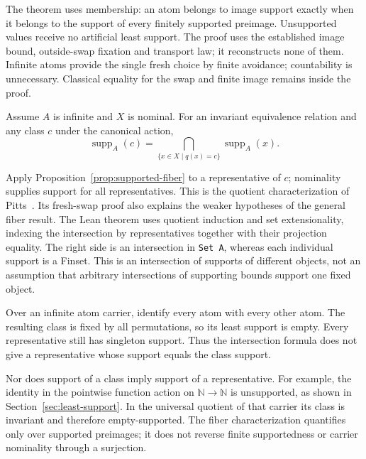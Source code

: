The theorem  uses
membership: an atom belongs to image support exactly
when it belongs to the support of every finitely supported preimage.
Unsupported values receive no artificial least support. The proof uses
the established image bound, outside-swap fixation and transport law;
it reconstructs none of them. Infinite atoms provide the single fresh
choice by finite avoidance; countability is unnecessary. Classical equality
for the swap and finite image remains inside the proof.

\begin{proposition}
\label{prop:quotient-support-intersection}
Assume $A$ is infinite and $X$ is nominal. For an invariant equivalence
relation and any class $c$ under the canonical action,
\[
  \operatorname{supp}_A(c)
  =\bigcap_{\{x\in X\mid q(x)=c\}}\operatorname{supp}_A(x).
\]
\end{proposition}

Apply Proposition~\ref{prop:supported-fiber} to a representative of $c$;
nominality supplies support for all representatives. This is the quotient
characterization of Pitts~\cite[Proposition~2.30, pp.~45--46]{pitts2013}.
Its fresh-swap proof also explains the weaker hypotheses of the general
fiber result. The Lean theorem 
uses quotient induction and set extensionality, indexing the intersection
by representatives together with their projection equality. The right side
is an intersection in \texttt{Set A}, whereas each individual support is
a Finset. This is an intersection of supports of different objects, not an
assumption that arbitrary intersections of supporting bounds support one
fixed object.

\begin{example}
\label{ex:quotient-support-nonattainment}
Over an infinite atom carrier, identify every atom with every other atom.
The resulting class is fixed
by all permutations, so its least support is empty. Every representative
still has singleton support. Thus the intersection formula does not give
a representative whose support equals the class support.
\end{example}

Nor does support of a class imply support of a representative. For example,
the identity in the pointwise function action on $\mathbb N\to\mathbb N$
is unsupported, as shown in Section~\ref{sec:least-support}. In the universal
quotient of that carrier its class is invariant and therefore empty-supported.
The fiber characterization quantifies only over supported preimages; it
does not reverse finite supportedness or carrier nominality through a
surjection.

